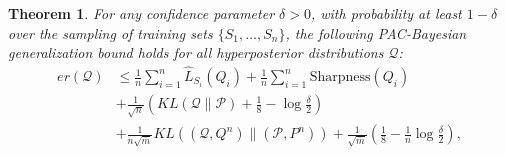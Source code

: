 \documentclass[letterpaper]{article} %
\newtheorem{theorem}{Theorem}
\begin{document}
\begin{theorem} 
For any confidence parameter  $ \delta > 0  $, with probability at least  $ 1 - \delta  $ over the sampling of training sets  $ \{ S_1, \dots, S_n \}  $, the following PAC-Bayesian generalization bound holds for all hyperposterior distributions  $ \mathcal{Q}  $: 
\[ \begin{aligned} er(\mathcal{Q}) &\leq \frac{1}{n} \sum_{i=1}^n \hat{L}_{S_i}(Q_i) + \frac{1}{n} \sum_{i=1}^n \text{Sharpness}(Q_i) \\ &+ \frac{1}{\sqrt{n}} \left( KL(\mathcal{Q} \| \mathcal{P}) + \frac{1}{8} - \log \frac{\delta}{2} \right) \\ &+ \frac{1}{n\sqrt{\bar{m}}} KL\left( (\mathcal{Q}, Q^n) \| (\mathcal{P}, P^n) \right) + \frac{1}{\sqrt{\bar{m}}} \left( \frac{1}{8} - \frac{1}{n} \log \frac{\delta}{2} \right), \end{aligned} \] 
\end{theorem}
\end{document}
